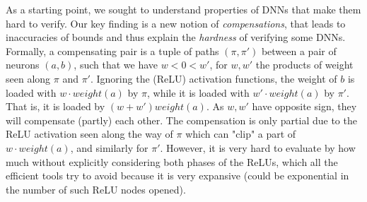 {\color{red}
As a starting point, we sought to understand properties of DNNs that make them hard to verify.
Our key finding is a new notion of {\em compensations}, that leads to inaccuracies of bounds and thus explain the {\em hardness} of verifying some DNNs.} Formally, a compensating pair is a tuple of paths $(\pi,\pi')$ between a pair of neurons $(a,b)$, such that we have $w < 0 < w'$, for $w,w'$ the products of weight seen along $\pi$ and $\pi'$. Ignoring the (ReLU) activation functions, the weight of $b$ is loaded with $w \cdot weight(a)$ by $\pi$, while it is loaded with $w' \cdot weight(a)$ by $\pi'$. That is, it is loaded by $(w+w') weight(a)$. As $w,w'$ have opposite sign, they will compensate (partly) each other. The compensation is only partial due to the ReLU activation seen along the way of $\pi$ which can "clip" a part of $w \cdot weight(a)$, and similarly for $\pi'$. However, it is very hard to evaluate by how much without explicitly considering both phases of the ReLUs, which all the efficient tools try to avoid because it is very expansive (could be exponential in the number of such ReLU nodes opened).



